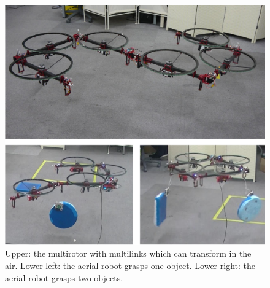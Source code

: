 \begin{figure}[t]
  \begin{center}
    \includegraphics[width=1.0\columnwidth]{figs/object_transportation.pdf}
  \end{center}
  \caption{Upper: the multirotor with multilinks which can transform in the air. Lower left: the aerial robot grasps one object. Lower right: the aerial robot grasps two objects.}
  \label{figure:system}
\end{figure}
